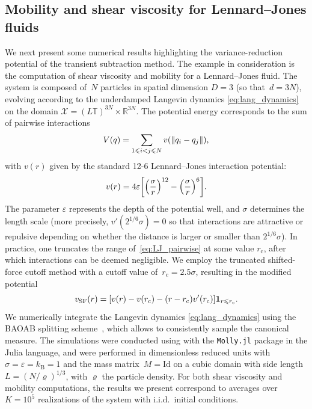 \documentclass[11pt]{article}
\newcommand{\T}{\mathbb{T}}
\newcommand{\R}{\mathbb{R}}
\newcommand{\ind}{\mathbf{1}}
\renewcommand{\leq}{\leqslant}
\DeclarePairedDelimiter\norm{\lVert}{\rVert}
\DeclarePairedDelimiter\paren{\lparen}{\rparen}
\DeclarePairedDelimiter\bkt{\lbrack}{\rbrack}
\theoremstyle{definition}
\begin{document}
\subsection{Mobility and shear viscosity for Lennard--Jones fluids}
\label{subsec:num_LJ}
We next present some numerical results highlighting the variance-reduction potential of the transient subtraction method. The example in consideration is the computation of shear viscosity and mobility for a Lennard--Jones fluid. The system is composed of~$N$ particles in spatial dimension $D=3$ (so that~$d=3N$), evolving according to the underdamped Langevin dynamics \eqref{eq:lang_dynamics} on the domain $\mathcal{X} = (L\T)^{3N} \times \R^{3N}$. The potential energy corresponds to the sum of pairwise interactions
\begin{equation}
\notag
	V(q) = \sum_{1\leq i<j\leq N} v(\norm{q_i - q_j}),
\end{equation}
with $v(r)$ given by the standard 12-6 Lennard--Jones interaction potential:
\begin{equation}
	v(r) = 4\varepsilon\bkt*{\paren*{\frac{\sigma}{r}}^{12} - \paren*{\frac{\sigma}{r}}^6}.
	\label{eq:LJ_pairwise}
\end{equation}
The parameter $\varepsilon$ represents the depth of the potential well, and $\sigma$ determines the length scale (more precisely, $v'(2^{1/6}\sigma)=0$ so that interactions are attractive or repulsive depending on whether the distance is larger or smaller than $2^{1/6}\sigma$).
In practice, one truncates the range of~\eqref{eq:LJ_pairwise} at some value $r_\mathrm{c}$, after which interactions can be deemed negligible. We employ the truncated shifted-force cutoff method with a cutoff value of~$r_\mathrm{c}=2.5\sigma$, resulting in the modified potential
\begin{equation}
\notag
	v_\mathrm{SF}(r) = [v(r) - v(r_\mathrm{c}) - (r - r_\mathrm{c})v'(r_\mathrm{c})]\ind_{r\leq r_\mathrm{c}}.
\end{equation}
We numerically integrate the Langevin dynamics \eqref{eq:lang_dynamics} using the BAOAB splitting scheme~\cite{leimkuhler2013}, which allows to consistently sample the canonical measure. The simulations were conducted using with the \texttt{Molly.jl} package \cite{greener2024} in the Julia language, and were performed in dimensionless reduced units with $\sigma = \varepsilon = k_\mathrm{B} = 1$ and the mass matrix~$M = \mathrm{Id}$ on a cubic domain with side length $L = (N/\varrho)^{1/3}$, with $\varrho$ the particle density. For both shear viscosity and mobility computations, the results we present correspond to averages over $K = 10^5$ realizations of the system with i.i.d.\ initial conditions. 
\end{document}

